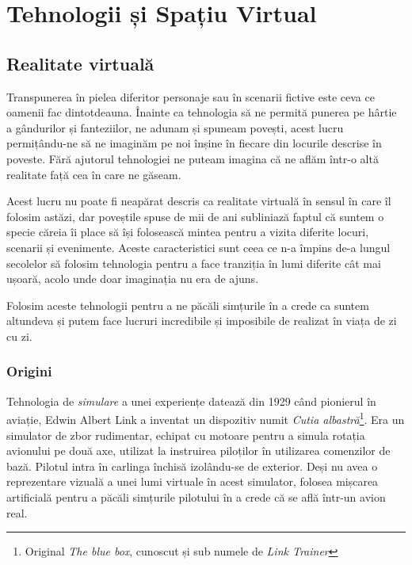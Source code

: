 \chapter {Tehnologii și Spațiu Virtual}

\section{Realitate virtuală}

Transpunerea în pielea diferitor personaje sau în scenarii fictive este ceva ce oamenii fac dintotdeauna. Înainte ca tehnologia să ne permită punerea pe hârtie a gândurilor și fanteziilor, ne adunam și spuneam povești, acest lucru permițându-ne să ne imaginăm pe noi înșine în fiecare din locurile descrise în poveste. Fără ajutorul tehnologiei ne puteam imagina că ne aflăm într-o altă realitate față cea în care ne găseam.

Acest lucru nu poate fi neapărat descris ca realitate virtuală în sensul în care îl folosim astăzi, dar poveștile spuse de mii de ani subliniază faptul că suntem o specie căreia îi place să își folosească mintea pentru a vizita diferite locuri, scenarii și evenimente.
Aceste caracteristici sunt ceea ce n-a împins de-a lungul secolelor să folosim tehnologia pentru a face tranziția în lumi diferite cât mai ușoară, acolo unde doar imaginația nu era de ajuns.

Folosim aceste tehnologii pentru a ne păcăli simțurile în a crede ca suntem altundeva și putem face lucruri incredibile și imposibile de realizat în viața de zi cu zi.

\subsection{Origini}

Tehnologia de \textit{simulare} a unei experiențe datează din 1929 când pionierul în aviație, Edwin Albert Link a inventat un dispozitiv numit \textit{Cutia albastră}\footnote{Original \textit{The blue box}, cunoscut și sub numele de \textit{Link Trainer}}. Era un simulator de zbor  rudimentar, echipat cu motoare pentru a simula rotația avionului pe două axe, utilizat la instruirea piloților în utilizarea comenzilor de bază. Pilotul intra în carlinga închisă izolându-se de exterior. Deși nu avea o reprezentare vizuală a unei lumi virtuale în acest simulator, folosea mișcarea artificială pentru a păcăli simțurile pilotului în a crede că se află într-un avion real.

\newpage


